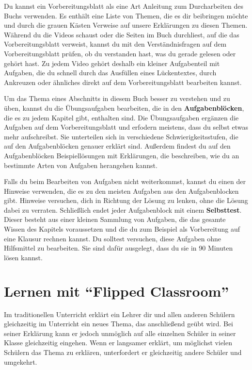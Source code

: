\documentclass[../main.tex]{subfiles}
\begin{document}
Du kannst ein Vorbereitungsblatt als eine Art Anleitung zum Durcharbeiten des Buchs verwenden. Es enthält eine Liste von Themen, die es dir beibringen möchte und durch die grauen Kästen Verweise auf unsere Erklärungen zu diesen Themen. Während du die Videos schaust oder die Seiten im Buch durchliest, auf die das Vorbereitungsblatt verweist, kannst du mit den Verständnisfragen auf dem Vorbereitungsblatt prüfen, ob du verstanden hast, was du gerade gelesen oder gehört hast. Zu jedem Video gehört deshalb ein kleiner Aufgabenteil mit Aufgaben, die du schnell durch das Ausfüllen eines Lückentextes, durch Ankreuzen oder ähnliches direkt auf dem Vorbereitungsblatt bearbeiten kannst.

Um das Thema eines Abschnitts in diesem Buch besser zu verstehen und zu üben, kannst du die Übungsaufgaben bearbeiten, die in den \textbf{Aufgabenblöcken}, die es zu jedem Kapitel gibt, enthalten sind. Die Übungsaufgaben ergänzen die Aufgaben auf dem Vorbereitungsblatt und erfodern meistens, dass du selbst etwas mehr aufschreibst. Sie unterteilen sich in verschiedene Schwierigkeitsstufen, die auf den Aufgabenblöcken genauer erklärt sind. Außerdem findest du auf den Aufgabenblöcken Beispiellösungen mit Erklärungen, die beschreiben, wie du an bestimmte Arten von Aufgaben herangehen kannst.

Falls du beim Bearbeiten von Aufgaben nicht weiterkommst, kannst du einen der Hinweise verwenden, die es zu den meisten Aufgaben aus den Aufgabenblocken gibt. Hinweise versuchen, dich in Richtung der Lösung zu lenken, ohne die Lösung dabei zu verraten. Schließlich endet jeder Aufgabenblock mit einem \textbf{Selbsttest}. Dieser besteht aus einer kleinen Sammlung von Aufgaben, die das gesamte Wissen des Kapitels voraussetzen und die du zum Beispiel als Vorbereitung auf eine Klausur rechnen kannst. Du solltest versuchen, diese Aufgaben ohne Hilfsmittel zu bearbeiten. Sie sind dafür ausgelegt, dass du sie in 90 Minuten lösen kannst.

\newpage
\section*{Lernen mit \enquote{Flipped Classroom}}
Im traditionellen Unterricht erklärt ein Lehrer dir und allen anderen Schülern gleichzeitig im Unterricht ein neues Thema, das anschließend geübt wird. Bei seiner Erklärung kann er jedoch unmöglich auf alle einzelnen Schüler in seiner Klasse gleichzeitig eingehen. Wenn er langsamer erklärt, um möglichst vielen Schülern das Thema zu erklären, unterfordert er gleichzeitig andere Schüler und umgekehrt.
\end{document}
